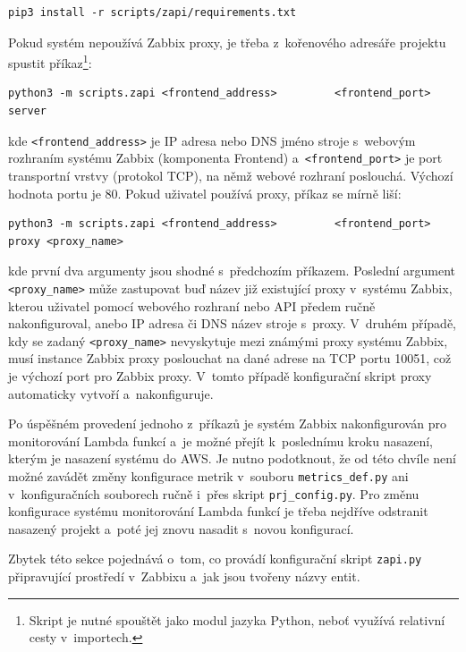 \documentclass[czech, ing, kiv, he, iso690]{fasthesis}
\begin{document}
\begin{lstlisting}[breaklines=true]
  pip3 install -r scripts/zapi/requirements.txt
\end{lstlisting}

Pokud systém nepoužívá Zabbix proxy, je třeba z~kořenového adresáře projektu spustit příkaz\footnote{Skript je nutné spouštět jako modul jazyka Python, neboť využívá relativní cesty v~importech.}:

\begin{lstlisting}[breaklines=true]
  python3 -m scripts.zapi <frontend_address>         <frontend_port> server
\end{lstlisting}
kde \verb|<frontend_address>| je IP adresa nebo DNS jméno stroje s~webovým rozhraním systému Zabbix (komponenta Frontend) a~\verb|<frontend_port>| je port transportní vrstvy (protokol TCP), na němž webové rozhraní poslouchá. Výchozí hodnota portu je 80. Pokud uživatel používá proxy, příkaz se mírně liší:

\begin{lstlisting}[breaklines=true]
  python3 -m scripts.zapi <frontend_address>         <frontend_port> proxy <proxy_name>
\end{lstlisting}
kde první dva argumenty jsou shodné s~předchozím příkazem. Poslední argument \verb|<proxy_name>| může zastupovat buď název již existující proxy v~systému Zabbix, kterou uživatel pomocí webového rozhraní nebo API předem ručně nakonfiguroval, anebo IP adresa či DNS název stroje s~proxy. V~druhém případě, kdy se zadaný \verb|<proxy_name>| nevyskytuje mezi známými proxy systému Zabbix, musí instance Zabbix proxy poslouchat na dané adrese na TCP portu 10051, což je výchozí port pro Zabbix proxy. V~tomto případě konfigurační skript proxy automaticky vytvoří a~nakonfiguruje.

Po úspěšném provedení jednoho z~příkazů je systém Zabbix nakonfigurován pro monitorování Lambda funkcí a~je možné přejít k~poslednímu kroku nasazení, kterým je nasazení systému do AWS. Je nutno podotknout, že od této chvíle není možné zavádět změny konfigurace metrik v~souboru \verb|metrics_def.py| ani v~konfiguračních souborech ručně i~přes skript \verb|prj_config.py|. Pro změnu konfigurace systému monitorování Lambda funkcí je třeba nejdříve odstranit nasazený projekt a~poté jej znovu nasadit s~novou konfigurací.

Zbytek této sekce pojednává o~tom, co provádí konfigurační skript \verb|zapi.py| připravující prostředí v~Zabbixu a~jak jsou tvořeny názvy entit.
\end{document}
